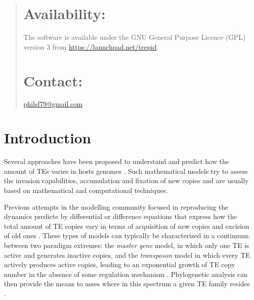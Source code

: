 \documentclass{bioinfo}
\begin{document}
\begin{abstract}
\section{Availability:}
The software is available under the GNU General Purpose Licence (GPL) version 3 from
\url{https://launchpad.net/trepid}.


\section{Contact:} 
\href{philsf79@gmail.com}{philsf79@gmail.com}
\end{abstract}

\section{Introduction} 

Several approaches have been proposed to understand and predict how
the amount of TEs varies in hosts genomes
\citep{rouzic2005,HCX+05,SKR05}. Such mathematical models try to
assess the invasion capabilities, accumulation and fixation of new
copies and are usually based on mathematical and computational
techniques.

Previous attempts in the modelling community focused in reproducing
the dynamics predicte by differential or difference equations that
express how the total amount of TE copies vary in terms of acquisition
of new copies and excision of old ones
\citep{QA97,QA98,DCB05,DLC+06}.%
These types of models can typically be characterized in a continuum
between two paradigm extremes: the \emph{master gene} model, in which
only one TE is active and generates inactive copies, and the
\emph{transposon} model in which every TE actively produces active
copies, leading to an exponential growth of TE copy number in the
absence of some regulation mechanism \citep{KRP05}. Phylogenetic
analysis can then provide the means to asses where in this spectrum a
given TE family resides \citep{BJ06,JB06}.
\end{document}
